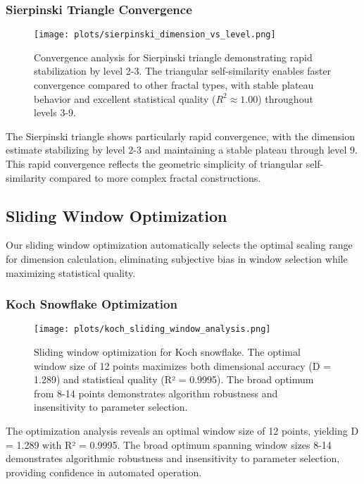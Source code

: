 \documentclass[preprint,12pt]{elsarticle}
\begin{document}
\subsubsection{Sierpinski Triangle Convergence}

\begin{figure}[ht]
\centering
\texttt{[image: plots/sierpinski\_dimension\_vs\_level.png]}
\caption{Convergence analysis for Sierpinski triangle demonstrating rapid stabilization by level 2-3. The triangular self-similarity enables faster convergence compared to other fractal types, with stable plateau behavior and excellent statistical quality ($R^2 \approx 1.00$) throughout levels 3-9.}
\label{fig:sierpinski_convergence}
\end{figure}

The Sierpinski triangle shows particularly rapid convergence, with the dimension estimate stabilizing by level 2-3 and maintaining a stable plateau through level 9. This rapid convergence reflects the geometric simplicity of triangular self-similarity compared to more complex fractal constructions.

\subsection{Sliding Window Optimization}

Our sliding window optimization automatically selects the optimal scaling range for dimension calculation, eliminating subjective bias in window selection while maximizing statistical quality.

\subsubsection{Koch Snowflake Optimization}

\begin{figure}[ht]
\centering
\texttt{[image: plots/koch\_sliding\_window\_analysis.png]}
\caption{Sliding window optimization for Koch snowflake. The optimal window size of 12 points maximizes both dimensional accuracy (D = 1.289) and statistical quality (R² = 0.9995). The broad optimum from 8-14 points demonstrates algorithm robustness and insensitivity to parameter selection.}
\label{fig:koch_optimization}
\end{figure}

The optimization analysis reveals an optimal window size of 12 points, yielding D = 1.289 with R² = 0.9995. The broad optimum spanning window sizes 8-14 demonstrates algorithmic robustness and insensitivity to parameter selection, providing confidence in automated operation.
\end{document}
